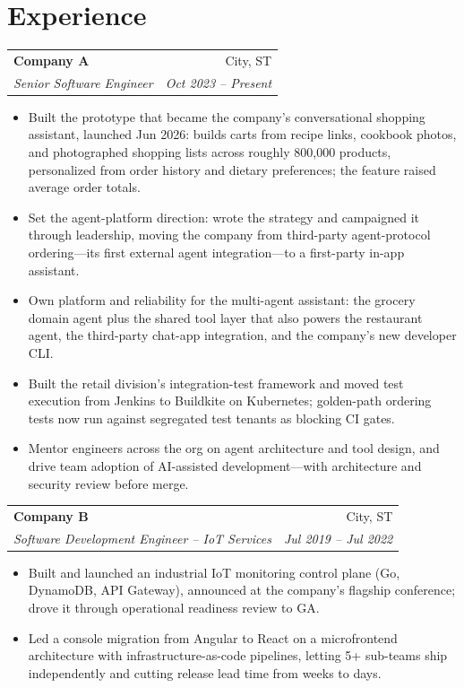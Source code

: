 \documentclass[letterpaper,10pt]{article}
\makeatletter
\newcommand{\resumeEntry}[4]{%
  \begin{tabular*}{\linewidth}{@{}l@{\extracolsep{\fill}}r@{}}
    \textbf{#1} & #2 \\
    \textit{\small #3} & \textit{\small #4} \\
  \end{tabular*}%
}
\makeatother
\begin{document}
\section{Experience}
\begin{description}
  \item
        \resumeEntry{Company A}{City, ST}{Senior Software Engineer}{Oct 2023 -- Present}
        \begin{itemize}
          \item Built the prototype that became the company's conversational shopping assistant, launched Jun 2026: builds carts from recipe links, cookbook photos, and photographed shopping lists across roughly 800,000 products, personalized from order history and dietary preferences; the feature raised average order totals.
          \item Set the agent-platform direction: wrote the strategy and campaigned it through leadership, moving the company from third-party agent-protocol ordering---its first external agent integration---to a first-party in-app assistant.
          \item Own platform and reliability for the multi-agent assistant: the grocery domain agent plus the shared tool layer that also powers the restaurant agent, the third-party chat-app integration, and the company's new developer CLI.
          \item Built the retail division's integration-test framework and moved test execution from Jenkins to Buildkite on Kubernetes; golden-path ordering tests now run against segregated test tenants as blocking CI gates.
          \item Mentor engineers across the org on agent architecture and tool design, and drive team adoption of AI-assisted development---with architecture and security review before merge.
        \end{itemize}
  \item
        \resumeEntry{Company B}{City, ST}{Software Development Engineer -- IoT Services}{Jul 2019 -- Jul 2022}
        \begin{itemize}
          \item Built and launched an industrial IoT monitoring control plane (Go, DynamoDB, API Gateway), announced at the company's flagship conference; drove it through operational readiness review to GA.
          \item Led a console migration from Angular to React on a microfrontend architecture with infrastructure-as-code pipelines, letting 5+ sub-teams ship independently and cutting release lead time from weeks to days.

\end{itemize}
\end{description}
\end{document}
